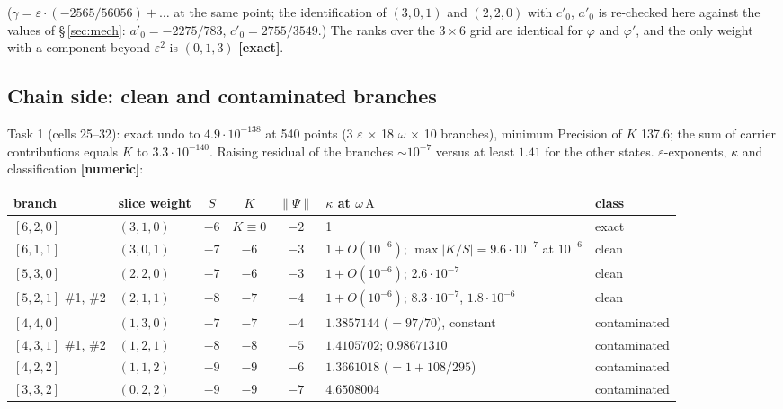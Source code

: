 \documentclass[10pt]{article}
\begin{document}
($\gamma=\varepsilon\cdot(-2565/56056)+\dots$ at the same point; the identification of $(3,0,1)$ and $(2,2,0)$ with $c'_0$, $a'_0$ is re-checked here against the values of \S\,\ref{sec:mech}: $a'_0=-2275/783$, $c'_0=2755/3549$.) The ranks over the $3\times6$ grid are identical for $\varphi$ and $\varphi'$, and the only weight with a component beyond $\varepsilon^2$ is $(0,1,3)$ \textbf{[exact]}.

\subsection{Chain side: clean and contaminated branches}\label{sec:a310chain}

Task 1 (cells 25--32): exact undo to $4.9\cdot10^{-138}$ at 540 points (3 $\varepsilon$ $\times$ 18 $\omega$ $\times$ 10 branches), minimum Precision of $K$ 137.6; the sum of carrier contributions equals $K$ to $3.3\cdot10^{-140}$. Raising residual of the branches $\sim10^{-7}$ versus at least $1.41$ for the other states. $\varepsilon$-exponents, $\kappa$ and classification \textbf{[numeric]}:

\begin{center}\footnotesize\setlength{\tabcolsep}{3pt}\begin{longtable}{@{}p{1.9cm}p{1.3cm}cccp{5.6cm}p{2.0cm}@{}}\toprule
\textbf{branch} & \textbf{slice weight} & \textbf{$S$} & \textbf{$K$} & \textbf{$\lVert\Psi\rVert$} & \textbf{$\kappa$ at $\omega\,\mathrm{A}$} & \textbf{class} \\\midrule\endhead
$[6,2,0]$ & $(3,1,0)$ & $-6$ & $K\equiv0$ & $-2$ & 1 & exact \\
$[6,1,1]$ & $(3,0,1)$ & $-7$ & $-6$ & $-3$ & $1+O(10^{-6})$; $\max\lvert K/S\rvert=9.6\cdot10^{-7}$ at $10^{-6}$ & clean \\
$[5,3,0]$ & $(2,2,0)$ & $-7$ & $-6$ & $-3$ & $1+O(10^{-6})$; $2.6\cdot10^{-7}$ & clean \\
$[5,2,1]$ \#1, \#2 & $(2,1,1)$ & $-8$ & $-7$ & $-4$ & $1+O(10^{-6})$; $8.3\cdot10^{-7}$, $1.8\cdot10^{-6}$ & clean \\
$[4,4,0]$ & $(1,3,0)$ & $-7$ & $-7$ & $-4$ & $1.3857144$ ($=97/70$), constant & contaminated \\
$[4,3,1]$ \#1, \#2 & $(1,2,1)$ & $-8$ & $-8$ & $-5$ & $1.4105702$; $0.98671310$ & contaminated \\
$[4,2,2]$ & $(1,1,2)$ & $-9$ & $-9$ & $-6$ & $1.3661018$ ($=1+108/295$) & contaminated \\
$[3,3,2]$ & $(0,2,2)$ & $-9$ & $-9$ & $-7$ & $4.6508004$ & contaminated \\
\bottomrule\end{longtable}\end{center}
\end{document}
